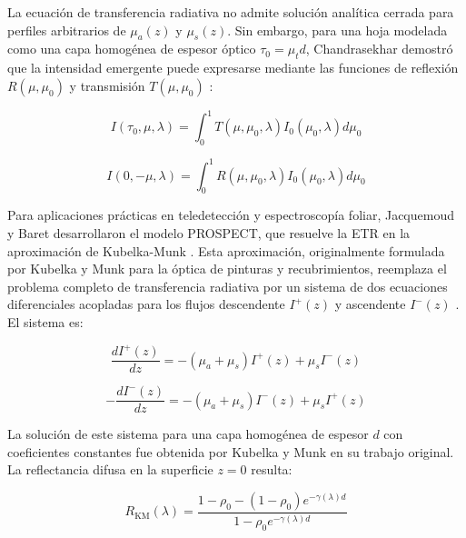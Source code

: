 \documentclass[12pt, a4paper]{article}
\begin{document}
	La ecuación de transferencia radiativa no admite solución analítica cerrada para perfiles arbitrarios de $\mu_a(z)$ y $\mu_s(z)$. Sin embargo, para una hoja modelada como una capa homogénea de espesor óptico $\tau_0 = \mu_t d$, Chandrasekhar demostró que la intensidad emergente puede expresarse mediante las funciones de reflexión $R(\mu, \mu_0)$ y transmisión $T(\mu, \mu_0)$ \parencite{Chandrasekhar1960}:
	
	\begin{equation}
		I(\tau_0, \mu, \lambda) = \int_{0}^{1} T(\mu, \mu_0, \lambda) I_0(\mu_0, \lambda) d\mu_0
		\label{eq:solucion_etr}
	\end{equation}
	
	\begin{equation}
		I(0, -\mu, \lambda) = \int_{0}^{1} R(\mu, \mu_0, \lambda) I_0(\mu_0, \lambda) d\mu_0
		\label{eq:reflectancia_etr}
	\end{equation}
	
	Para aplicaciones prácticas en teledetección y espectroscopía foliar, Jacquemoud y Baret desarrollaron el modelo PROSPECT, que resuelve la ETR en la aproximación de Kubelka-Munk \parencite{jacquemoud1990}. Esta aproximación, originalmente formulada por Kubelka y Munk para la óptica de pinturas y recubrimientos, reemplaza el problema completo de transferencia radiativa por un sistema de dos ecuaciones diferenciales acopladas para los flujos descendente $I^+(z)$ y ascendente $I^-(z)$ \parencite{Kubelka1931}. El sistema es:
	
	\begin{equation}
		\frac{dI^+(z)}{dz} = -(\mu_a + \mu_s) I^+(z) + \mu_s I^-(z)
		\label{eq:kubelka_munk_1}
	\end{equation}
	
	\begin{equation}
		-\frac{dI^-(z)}{dz} = -(\mu_a + \mu_s) I^-(z) + \mu_s I^+(z)
		\label{eq:kubelka_munk_2}
	\end{equation}
	
	La solución de este sistema para una capa homogénea de espesor $d$ con coeficientes constantes fue obtenida por Kubelka y Munk en su trabajo original. La reflectancia difusa en la superficie $z=0$ resulta:
	
	\begin{equation}
		R_{\text{KM}}(\lambda) = \frac{1 - \rho_0 - (1 - \rho_0) e^{-\gamma(\lambda) d}}{1 - \rho_0 e^{-\gamma(\lambda) d}}
		\label{eq:reflectancia_kubelka_munk}
	\end{equation}
	
\end{document}

